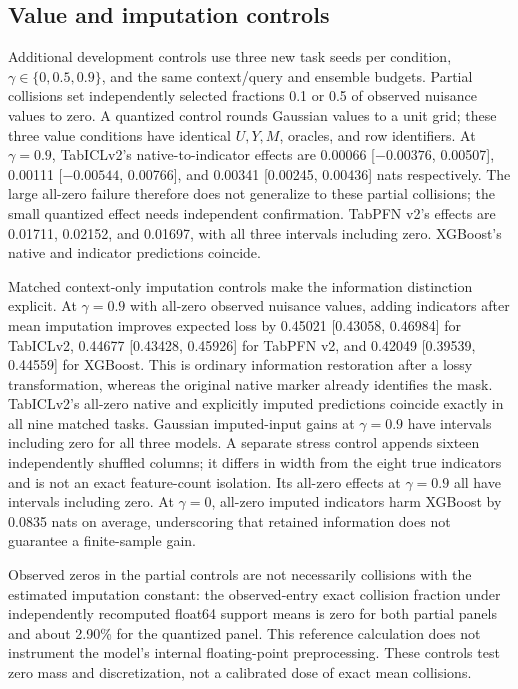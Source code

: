 \documentclass[10pt]{article}
\begin{document}
\subsection{Value and imputation controls}
Additional development controls use three new task seeds per condition, $\gamma\in\{0,0.5,0.9\}$, and the same context/query and ensemble budgets. Partial collisions set independently selected fractions 0.1 or 0.5 of observed nuisance values to zero. A quantized control rounds Gaussian values to a unit grid; these three value conditions have identical $U,Y,M$, oracles, and row identifiers. At $\gamma=0.9$, TabICLv2's native-to-indicator effects are 0.00066 [$-0.00376$, 0.00507], 0.00111 [$-0.00544$, 0.00766], and 0.00341 [0.00245, 0.00436] nats respectively. The large all-zero failure therefore does not generalize to these partial collisions; the small quantized effect needs independent confirmation. TabPFN v2's effects are 0.01711, 0.02152, and 0.01697, with all three intervals including zero. XGBoost's native and indicator predictions coincide.

Matched context-only imputation controls make the information distinction explicit. At $\gamma=0.9$ with all-zero observed nuisance values, adding indicators after mean imputation improves expected loss by 0.45021 [0.43058, 0.46984] for TabICLv2, 0.44677 [0.43428, 0.45926] for TabPFN v2, and 0.42049 [0.39539, 0.44559] for XGBoost. This is ordinary information restoration after a lossy transformation, whereas the original native marker already identifies the mask. TabICLv2's all-zero native and explicitly imputed predictions coincide exactly in all nine matched tasks. Gaussian imputed-input gains at $\gamma=0.9$ have intervals including zero for all three models. A separate stress control appends sixteen independently shuffled columns; it differs in width from the eight true indicators and is not an exact feature-count isolation. Its all-zero effects at $\gamma=0.9$ all have intervals including zero. At $\gamma=0$, all-zero imputed indicators harm XGBoost by 0.0835 nats on average, underscoring that retained information does not guarantee a finite-sample gain.

Observed zeros in the partial controls are not necessarily collisions with the estimated imputation constant: the observed-entry exact collision fraction under independently recomputed float64 support means is zero for both partial panels and about 2.90\% for the quantized panel. This reference calculation does not instrument the model's internal floating-point preprocessing. These controls test zero mass and discretization, not a calibrated dose of exact mean collisions.
\end{document}
